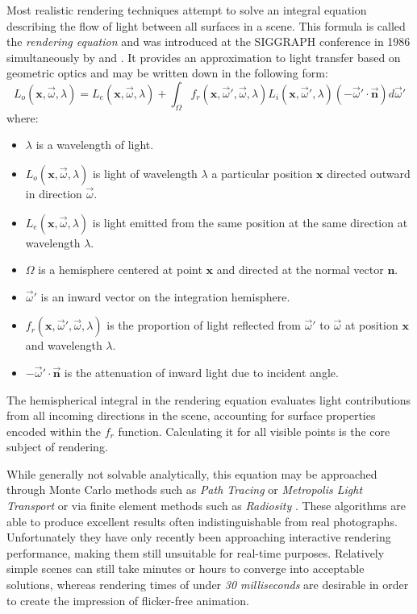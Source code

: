 Most realistic rendering techniques attempt to solve an integral equation describing the flow of light between all surfaces in a scene. This formula is called the \emph{rendering equation} and was introduced at the SIGGRAPH conference in 1986 simultaneously by \citet{Kajiya86RenderingEq} and \citet{Immel86}. It provides an approximation to light transfer based on geometric optics and may be written down in the following form:
\[
L_o(\mathbf x, \overrightarrow{\omega}, \lambda) = L_e(\mathbf x, \overrightarrow{\omega}, \lambda) + \int_\Omega f_r(\mathbf x, \overrightarrow{\omega}', \overrightarrow{\omega}, \lambda) L_i(\mathbf x, \overrightarrow{\omega}', \lambda) (-\overrightarrow{\omega}' \cdot \overrightarrow{\mathbf n}) d \overrightarrow{\omega}'
\]
where:
\begin{itemize}
\item $\lambda$ is a wavelength of light.
\item $L_o(\mathbf x, \overrightarrow{\omega}, \lambda)$ is light of wavelength $\lambda$ a particular position $\mathbf x$ directed outward in direction $\overrightarrow{\omega}$.
\item $L_e(\mathbf x, \overrightarrow{\omega}, \lambda)$ is light emitted from the same position at the same direction at wavelength $\lambda$.
\item $\Omega$ is a hemisphere centered at point $\mathbf x$ and directed at the normal vector $\mathbf n$.
\item $\overrightarrow{\omega}'$ is an inward vector on the integration hemisphere.
\item $f_r(\mathbf x, \overrightarrow{\omega}', \overrightarrow{\omega}, \lambda)$ is the proportion of light reflected from $\overrightarrow{\omega}'$ to $\overrightarrow{\omega}$ at position $\mathbf x$ and wavelength $\lambda$.
\item $-\overrightarrow{\omega}' \cdot \overrightarrow{\mathbf n}$ is the attenuation of inward light due to incident angle.
\end{itemize}

The hemispherical integral in the rendering equation evaluates light contributions from all incoming directions in the scene, accounting for surface properties encoded within the $f_r$ function. Calculating it for all visible points is the core subject of rendering.

While generally not solvable analytically, this equation may be approached through Monte Carlo methods such as \emph{Path Tracing} \cite{Kajiya86RenderingEq} or \emph{Metropolis Light Transport} \cite{MLT} or via finite element methods such as \emph{Radiosity} \cite{Radiosity}. These algorithms are able to produce excellent results often indistinguishable from real photographs. Unfortunately they have only recently been approaching interactive rendering performance, making them still unsuitable for real-time purposes. Relatively simple scenes can still take minutes or hours to converge into acceptable solutions, whereas rendering times of under \emph{30 milliseconds} are desirable in order to create the impression of flicker-free animation.

